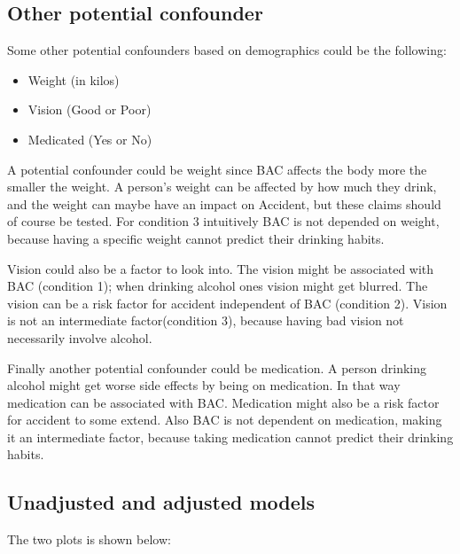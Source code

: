 \subsection{Other potential confounder}

Some other potential confounders based on demographics could be the following:
\begin{itemize}
    \item Weight (in kilos)
    \item Vision (Good or Poor)
    \item Medicated (Yes or No)
    
\end{itemize}

A potential confounder could be weight since BAC affects the body more the smaller the weight. A person's weight can be affected by how much they drink, and the weight can maybe have an impact on Accident, but these claims should of course be tested.
For condition 3 intuitively BAC is not depended on weight, because having a specific weight cannot predict their drinking habits.

Vision could also be a factor to look into. The vision might be associated with BAC (condition 1); when drinking alcohol ones vision might get blurred. The vision can be a risk factor for accident independent of BAC (condition 2). Vision is not an intermediate factor(condition 3), because having bad vision not necessarily involve alcohol. 

Finally another potential confounder could be medication. A person drinking alcohol might get worse side effects by being on medication. In that way medication can be associated with BAC. Medication might also be a risk factor for accident to some extend. Also BAC is not dependent on medication, making it an intermediate factor, because taking medication cannot predict their drinking habits.


\subsection{Unadjusted and adjusted models}

The two plots is shown below:

